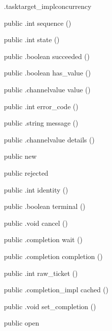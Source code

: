 \begin{CrexxClass}{.tasktarget\_impl}{concurrency}
\begin{Members}
    \Method
      {public}
      {.int}
      {sequence}
      {()}

    \Method
      {public}
      {.int}
      {state}
      {()}

    \Method
      {public}
      {.boolean}
      {succeeded}
      {()}

    \Method
      {public}
      {.boolean}
      {has\_value}
      {()}

    \Method
      {public}
      {.channelvalue}
      {value}
      {()}

    \Method
      {public}
      {.int}
      {error\_code}
      {()}

    \Method
      {public}
      {.string}
      {message}
      {()}

    \Method
      {public}
      {.channelvalue}
      {details}
      {()}

    \Factory
      {public}
      {new}
      {}

    \Factory
      {public}
      {rejected}
      {}

    \Method
      {public}
      {.int}
      {identity}
      {()}

    \Method
      {public}
      {.boolean}
      {terminal}
      {()}

    \Method
      {public}
      {.void}
      {cancel}
      {()}

    \Method
      {public}
      {.completion}
      {wait}
      {()}

    \Method
      {public}
      {.completion}
      {completion}
      {()}

    \Method
      {public}
      {.int}
      {raw\_ticket}
      {()}

    \Method
      {public}
      {.completion\_impl}
      {cached}
      {()}

    \Method
      {public}
      {.void}
      {set\_completion}
      {()}

    \Factory
      {public}
      {open}
      {}


\end{Members}
\end{CrexxClass}
